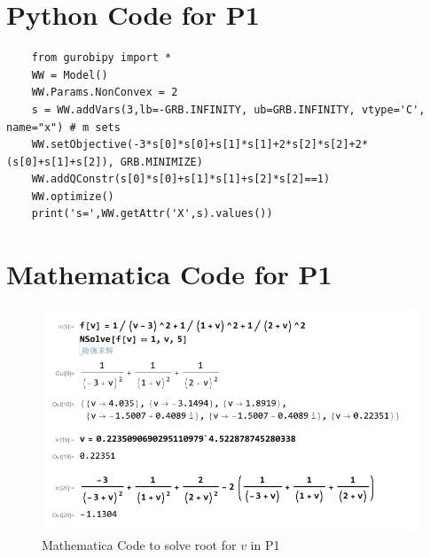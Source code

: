 \documentclass{article}
\theoremstyle{definition}
\theoremstyle{definition}
\theoremstyle{remark}
\begin{document}
\newpage
\section*{Python Code for P1}
\begin{verbatim}
    from gurobipy import *
    WW = Model()
    WW.Params.NonConvex = 2
    s = WW.addVars(3,lb=-GRB.INFINITY, ub=GRB.INFINITY, vtype='C', name="x") # m sets
    WW.setObjective(-3*s[0]*s[0]+s[1]*s[1]+2*s[2]*s[2]+2*(s[0]+s[1]+s[2]), GRB.MINIMIZE)
    WW.addQConstr(s[0]*s[0]+s[1]*s[1]+s[2]*s[2]==1)
    WW.optimize()
    print('s=',WW.getAttr('X',s).values())
\end{verbatim}
\section*{Mathematica Code for P1}
\begin{figure}[H]
    \centering
    \includegraphics[scale=1]{Code.png}
    \caption{Mathematica Code to solve root for $v$ in P1}
\end{figure}
\end{document}
